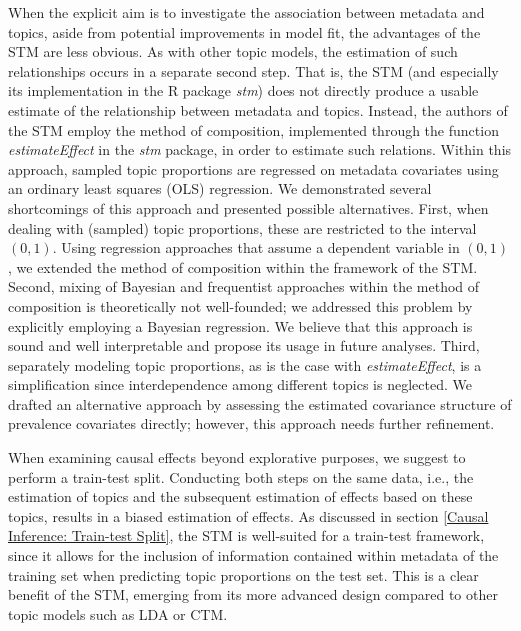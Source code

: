 When the explicit aim is to investigate the association between metadata and topics, aside from potential improvements in model fit, the advantages of the STM are less obvious. As with other topic models, the estimation of such relationships occurs in a separate second step. That is, the STM (and especially its implementation in the R package \textit{stm}) does not directly produce a usable estimate of the relationship between metadata and topics. Instead, the authors of the STM employ the method of composition, implemented through the function \textit{estimateEffect} in the \textit{stm} package, in order to estimate such relations. Within this approach, sampled topic proportions are regressed on metadata covariates using an ordinary least squares (OLS) regression. We demonstrated several shortcomings of this approach and presented possible alternatives. First, when dealing with (sampled) topic proportions, these are restricted to the interval $(0,1)$. Using regression approaches that assume a dependent variable in $(0,1)$, we extended the method of composition within the framework of the STM. Second, mixing of Bayesian and frequentist approaches within the method of composition is theoretically not well-founded; we addressed this problem by explicitly employing a Bayesian regression. We believe that this approach is sound and well interpretable and propose its usage in future analyses. Third, separately modeling topic proportions, as is the case with \textit{estimateEffect}, is a simplification since interdependence among different topics is neglected. We drafted an alternative approach by assessing the estimated covariance structure of prevalence covariates directly; however, this approach needs further refinement.

When examining causal effects beyond explorative purposes, we suggest to perform a train-test split. Conducting both steps on the same data, i.e., the estimation of topics and the subsequent estimation of effects based on these topics, results in a biased estimation of effects. As discussed in section \ref{Causal Inference: Train-test Split}, the STM is well-suited for a train-test framework, since it allows for the inclusion of information contained within metadata of the training set when predicting topic proportions on the test set. This is a clear benefit of the STM, emerging from its more advanced design compared to other topic models such as LDA or CTM.

